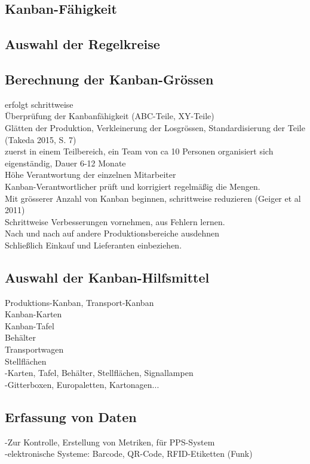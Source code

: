 \subsection{Kanban-Fähigkeit}
\subsection{Auswahl der Regelkreise}
\subsection{Berechnung der Kanban-Grössen}

erfolgt schrittweise\\
Überprüfung der Kanbanfähigkeit (ABC-Teile, XY-Teile)\\
Glätten der Produktion, Verkleinerung der Losgrössen, Standardisierung der Teile (Takeda 2015, S. 7)\\
zuerst in einem Teilbereich, ein Team von ca 10 Personen organisiert sich eigenständig, Dauer 6-12 Monate\\
Höhe Verantwortung der einzelnen Mitarbeiter\\
Kanban-Verantwortlicher prüft und korrigiert regelmäßig die Mengen.\\

Mit grösserer Anzahl von Kanban beginnen, schrittweise reduzieren (Geiger et al 2011)\\
Schrittweise Verbesserungen vornehmen, aus Fehlern lernen.\\
Nach und nach auf andere Produktionsbereiche ausdehnen\\
Schließlich Einkauf und Lieferanten einbeziehen.\\

\subsection{Auswahl der Kanban-Hilfsmittel}
Produktions-Kanban, Transport-Kanban\\
Kanban-Karten\\
Kanban-Tafel\\
Behälter\\
Transportwagen\\
Stellflächen\\
-Karten, Tafel, Behälter, Stellflächen, Signallampen\\
-Gitterboxen, Europaletten, Kartonagen...\\

\subsection{Erfassung von Daten}
-Zur Kontrolle, Erstellung von Metriken, für PPS-System\\
-elektronische Systeme: Barcode, QR-Code, RFID-Etiketten (Funk)\\

